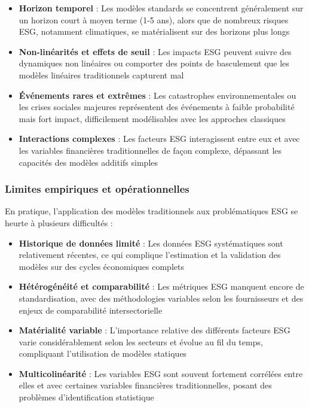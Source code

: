 \begin{itemize}
    \item \textbf{Horizon temporel} : Les modèles standards se concentrent généralement sur un horizon court à moyen terme (1-5 ans), alors que de nombreux risques ESG, notamment climatiques, se matérialisent sur des horizons plus longs
    
    \item \textbf{Non-linéarités et effets de seuil} : Les impacts ESG peuvent suivre des dynamiques non linéaires ou comporter des points de basculement que les modèles linéaires traditionnels capturent mal
    
    \item \textbf{Événements rares et extrêmes} : Les catastrophes environnementales ou les crises sociales majeures représentent des événements à faible probabilité mais fort impact, difficilement modélisables avec les approches classiques
    
    \item \textbf{Interactions complexes} : Les facteurs ESG interagissent entre eux et avec les variables financières traditionnelles de façon complexe, dépassant les capacités des modèles additifs simples
\end{itemize}

\subsubsection{Limites empiriques et opérationnelles}

En pratique, l'application des modèles traditionnels aux problématiques ESG se heurte à plusieurs difficultés :

\begin{itemize}
    \item \textbf{Historique de données limité} : Les données ESG systématiques sont relativement récentes, ce qui complique l'estimation et la validation des modèles sur des cycles économiques complets
    
    \item \textbf{Hétérogénéité et comparabilité} : Les métriques ESG manquent encore de standardisation, avec des méthodologies variables selon les fournisseurs et des enjeux de comparabilité intersectorielle
    
    \item \textbf{Matérialité variable} : L'importance relative des différents facteurs ESG varie considérablement selon les secteurs et évolue au fil du temps, compliquant l'utilisation de modèles statiques
    
    \item \textbf{Multicolinéarité} : Les variables ESG sont souvent fortement corrélées entre elles et avec certaines variables financières traditionnelles, posant des problèmes d'identification statistique
\end{itemize}

